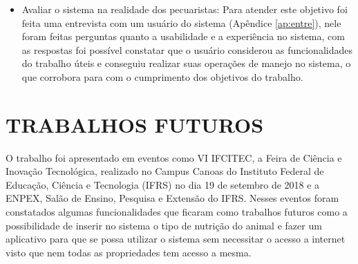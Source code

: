 \begin{itemize}
	\item Avaliar o sistema na realidade dos pecuaristas:
	\newline
	Para atender este objetivo foi feita uma entrevista com um usuário do sistema (Apêndice \ref{ap:entre}), nele foram feitas perguntas quanto a usabilidade e a experiência no sistema, com as respostas foi possível constatar que o usuário considerou as funcionalidades do trabalho úteis e conseguiu realizar suas operações de manejo no sistema, o que corrobora para com o cumprimento dos objetivos do trabalho.
\end{itemize}

\section{TRABALHOS FUTUROS}\label{chap:trabsfuturos}

O trabalho foi apresentado em eventos como VI IFCITEC, a Feira de Ciência e Inovação Tecnológica, realizado no Campus Canoas do Instituto Federal de Educação, Ciência e Tecnologia (IFRS) no dia 19 de setembro de 2018 e a ENPEX, Salão de Ensino, Pesquisa e Extensão do IFRS. Nesses eventos foram constatados algumas funcionalidades que ficaram como trabalhos futuros como a possibilidade de inserir no sistema o tipo de nutrição do animal e fazer um aplicativo para que se possa utilizar o sistema sem necessitar o acesso a internet visto que nem todas as propriedades tem acesso a mesma.
